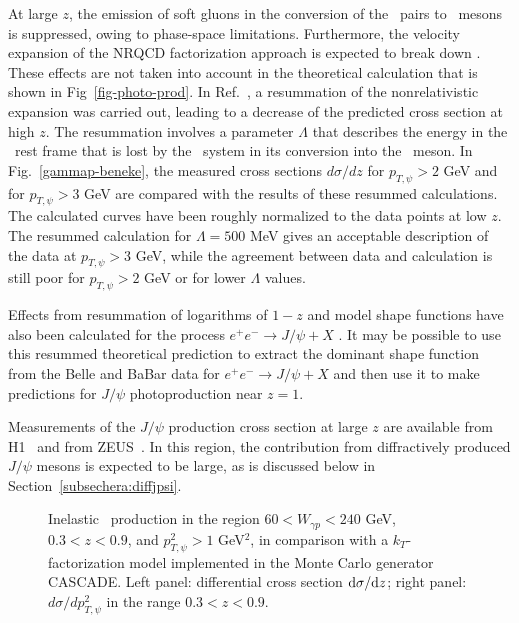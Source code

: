 At large $z$, 
the emission of soft gluons in the conversion of the
\ccbar\ pairs to \jpsi\ mesons is suppressed, owing to phase-space
limitations. Furthermore, the velocity expansion of the NRQCD
factorization approach is expected to break down \cite{Beneke:1997qw}. 
These effects are not taken into account in the theoretical calculation
that is shown in Fig~\ref{fig-photo-prod}.
In Ref.~\cite{Beneke:1999gq}, a resummation of the nonrelativistic
expansion was carried out, leading to a decrease of the predicted cross
section at high $z$.  
The resummation involves a parameter $\Lambda$ that describes 
the energy in the \ccbar\ rest frame that is lost by the \ccbar\ system
in its conversion into the \jpsi\ meson.
In Fig.~\ref{gammap-beneke}, the measured cross
sections $d\sigma/dz$ for ${p_{T,\psi}}>2$ GeV and for ${p_{T,\psi}}>3$
GeV are compared with the results of these resummed calculations.  The
calculated curves have been roughly normalized to the data points at low
$z$. The resummed calculation for $\Lambda=500$ MeV gives an acceptable
description of the data at \ensuremath{p_{T,\psi}}$ > 3$ GeV, while the
agreement between data and calculation is still poor for
\ensuremath{p_{T,\psi}}$ > 2$ GeV or for lower $\Lambda$ values.

Effects from resummation of logarithms of $1-z$ and model shape
functions have also been calculated for the process $e^+e^-\to
J/\psi+X$ \cite{Fleming:2003gt}. It may be possible to use this
resummed theoretical prediction to extract the dominant shape function
from the Belle and BaBar data for $e^+e^-\to J/\psi+X$ and then use it
to make predictions for $J/\psi$ photoproduction near $z=1$.

Measurements of the $J/\psi$ production cross section at large $z$ are 
available from H1~\cite{Aktas:2003zi} and from ZEUS~\cite{Chekanov:2002at}. 
In this region, the contribution from diffractively produced $J/\psi$ 
mesons is expected to be large, as is discussed below 
in Section~\ref{subsechera:diffjpsi}.

\begin{figure}
\begin{center}
\caption{Inelastic \jpsi\ production in the region  $60<W_{\gamma
p}<240$ GeV, $0.3<z<0.9$, and $p_{T,\psi}^2>1$ GeV$^2$, in comparison
with a $k_T$-factorization model implemented in the  Monte Carlo
generator CASCADE\cite{Jung:2001hk,Jung:2001hx}. Left panel:
differential cross section ${\rm d}\sigma/{\rm d}z$; right panel:
$d\sigma/d\ensuremath{p_{T,\psi}^2}$ in the range $0.3<z<0.9$.}
\label{gammap-cascade}
\end{center}
\end{figure}

